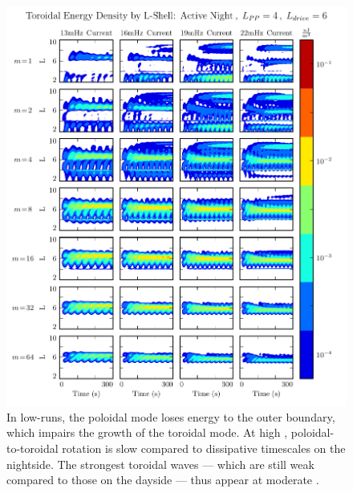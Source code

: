 \begin{figure}[!htb]
    \centering
    \includegraphics[width=\textwidth]{figures/layers_t_3_4_6.pdf}
    \caption[Radial Distribution of Toroidal Energy: Active Night]{
      In low-\azm runs, the poloidal mode loses energy to the outer boundary, which impairs the growth of the toroidal mode. At high \azm, poloidal-to-toroidal rotation is slow compared to dissipative timescales on the nightside. The strongest toroidal waves --- which are still weak compared to those on the dayside --- thus appear at moderate \azm. 
    }
    \label{fig_layers_t_3_4_6}
\end{figure}



